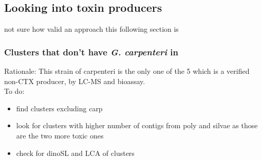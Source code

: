 \documentclass[12pt]{article}
\begin{document}

\subsection{Looking into toxin producers}
not sure how valid an approach this following section is
\subsubsection{Clusters that don't have \textit{G. carpenteri} in}
Rationale: This strain of carpenteri is the only one of the 5 which is a verified non-CTX producer, by LC-MS and bioassay.\\
To do:
\begin{itemize}
\item find clusters excluding carp
\item look for clusters with higher number of contigs from poly and silvae as those are the two more toxic ones
\item check for dinoSL and LCA of clusters
\end{itemize}
\end{document}

